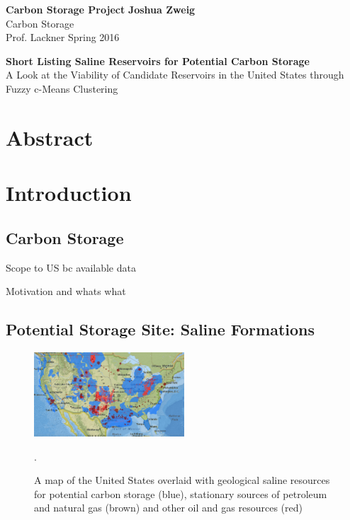 \documentclass[letterpaper, 12pt]{article}
\begin{document}
\noindent
\large\textbf{Carbon Storage Project} \hfill \textbf{Joshua Zweig} \\
\normalsize Carbon Storage \\
Prof. Lackner \hfill Spring 2016 \\

\begin{centering}
\textbf{Short Listing Saline Reservoirs for Potential Carbon Storage} \\
A Look at the Viability of Candidate Reservoirs in the United States through\\
Fuzzy c-Means Clustering\\
\end{centering}


\section*{Abstract}


\section{Introduction}
\subsection{Carbon Storage}
Scope to US bc available data


Motivation and whats what

\subsection{Potential Storage Site: Saline Formations}

\begin{figure} %
    \centering
    \includegraphics[width=0.5\textwidth]{saline_tight}
    \caption{\label{salinetight} A map of the United States overlaid with geological saline resources for potential carbon storage (blue), stationary sources of petroleum and natural gas (brown) and other oil and gas resources (red) \cite{atlas}}. 
\end{figure}
\end{document}
